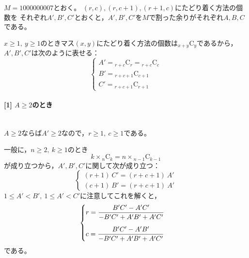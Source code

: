 \documentclass{article}
\newcommand{\myparagraph}[1]{\paragraph{#1}\mbox{}\\}
\newcommand{\combination}[2]{{}_{#1} \mathrm{C}_{#2}}
\begin{document}
$M = 1000000007$とおく。
$(r, c), (r, c + 1), (r + 1, c)$にたどり着く方法の個数を
それぞれ$A', B', C'$とおくと，$A', B', C'$を$M$で割った余りがそれぞれ$A, B, C$である。

$x \geq 1,\ y \geq 1$のときマス$(x, y)$にたどり着く方法の個数は$\combination{x + y}{y}$であるから，
$A', B', C'$は次のように表せる：
\begin{equation*}
    \begin{cases}
        A' = \combination{r + c}{r} = \combination{r + c}{c} \\
        B' = \combination{r + c + 1}{c + 1} \\
        C' = \combination{r + c + 1}{r + 1}
    \end{cases}
\end{equation*}

\myparagraph{[1] $A \geq 2$のとき}

$A \geq 2$ならば$A' \geq 2$なので，$r \geq 1,\ c \geq 1$である。

一般に，$n \geq 2,\ k \geq 1$のとき
\begin{equation*}
    k \times \combination{n}{k} = n \times \combination{n - 1}{k - 1}
\end{equation*}
が成り立つから，$A', B', C'$に関して次が成り立つ：
\begin{equation*}
    \begin{cases}
        (r + 1)\ C' = (r + c + 1)\ A' \\
        (c + 1)\ B' = (r + c + 1)\ A'
    \end{cases}
\end{equation*}
$1 \leq A' < B',\ 1 \leq A' < C'$に注意してこれを解くと，
\begin{equation*}
    \begin{cases}
        \vspace{10pt}
        r = \dfrac{B'C' - A'C'}{-B'C' + A'B' + A'C'} \\
        c = \dfrac{B'C' - A'B'}{-B'C' + A'B' + A'C'}
    \end{cases}
\end{equation*}
である。
\end{document}
